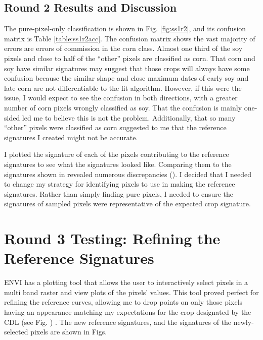 \subsection*{Round 2 Results and Discussion}

The pure-pixel-only classification is shown in Fig. \ref{fig:ss1r2}, and its confusion matrix is Table \ref{table:ss1r2acc}. The confusion matrix shows the vast majority of errors are errors of commission in the corn class. Almost one third of the soy pixels and close to half of the “other” pixels are classified as corn. That corn and soy have similar signatures may suggest that those crops will always have some confusion because the similar shape and close maximum dates of early soy and late corn are not differentiable to the fit algorithm. However, if this were the issue, I would expect to see the confusion in both directions, with a greater number of corn pixels wrongly classified as soy. That the confusion is mainly one-sided led me to believe this is not the problem. Additionally, that so many “other” pixels were classified as corn suggested to me that the reference signatures I created might not be accurate.


I plotted the signature of each of the pixels contributing to the reference signatures  to see what the signatures looked like. Comparing them to the signatures shown in \citeauthor{wardlow2005state-level} revealed numerous discrepancies \mkbibparens{\citeyear{wardlow2005state-level}}. I decided that I needed to change my strategy for identifying pixels to use in making the reference signatures. Rather than simply finding pure pixels, I needed to ensure the signatures of sampled pixels were representative of the expected crop signature.

\section{Round 3 Testing: Refining the Reference Signatures}
\label{appendix:testing:r3}

ENVI has a plotting tool that allows the user to interactively select pixels in a multi band raster and view plots of the pixels’ values. This tool proved perfect for refining the reference curves, allowing me to drop points on only those pixels having an appearance matching my expectations for the crop designated by the CDL (see Fig. )
. The new reference signatures, and the signatures of the newly-selected pixels are shown in Figs. 

